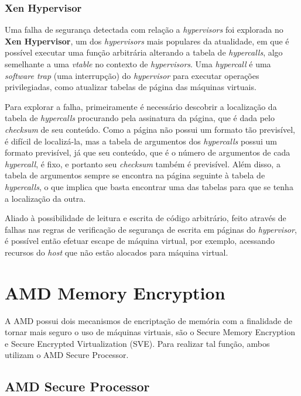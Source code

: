 \documentclass{report}
\begin{document}
\subsection{Xen Hypervisor}

Uma falha de segurança detectada com relação a \textit{hypervisors} foi
explorada no \textbf{Xen Hypervisor}, um dos \textit{hypervisors} mais
populares da atualidade, em que é possível executar uma função arbitrária
alterando a tabela de \textit{hypercalls}, algo semelhante a uma
\textit{vtable} no contexto de \textit{hypervisors}. Uma \textit{hypercall} é
uma \textit{software trap} (uma interrupção) do \textit{hypervisor} para
executar operações privilegiadas, como atualizar tabelas de página das máquinas
virtuais.

Para explorar a falha, primeiramente é necessário descobrir a localização da
tabela de \textit{hypercalls} procurando pela assinatura da página, que é dada
pelo \textit{checksum} de seu conteúdo. Como a página não possui um formato tão
previsível, é difícil de localizá-la, mas a tabela de argumentos dos
\textit{hypercalls} possui um formato previsível, já que seu conteúdo, que é o
número de argumentos de cada \textit{hypercall}, é fixo, e portanto seu
\textit{checksum} também é previsível. Além disso, a tabela de argumentos
sempre se encontra na página seguinte à tabela de \textit{hypercalls}, o que
implica que basta encontrar uma das tabelas para que se tenha a localização da
outra.

Aliado à possibilidade de leitura e escrita de código arbitrário, feito através
de falhas nas regras de verificação de segurança de escrita em páginas do
\textit{hypervisor}, é possível então efetuar escape de máquina virtual, por
exemplo, acessando recursos do \textit{host} que não estão alocados para
máquina virtual.

\chapter{AMD Memory Encryption}

A AMD possui dois mecanismos de encriptação de memória com a finalidade de
tornar mais seguro o uso de máquinas virtuais, são o Secure Memory Encryption e
Secure Encrypted Virtualization (SVE). Para realizar tal função, ambos utilizam
o AMD Secure Processor.

\section{AMD Secure Processor}
\end{document}
